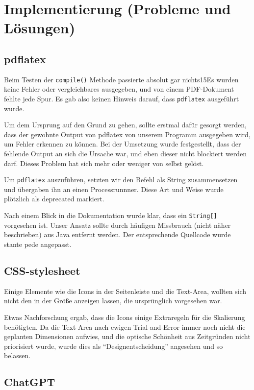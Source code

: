 \documentclass[stu, a4paper, 11pt, floatsintext]{apa7}
\begin{document}
\section{Implementierung (Probleme und Lösungen)}

\subsection{pdflatex}

\noindent Beim Testen der \texttt{compile()} Methode passierte absolut gar nichts15Es wurden keine Fehler oder vergleichbares ausgegeben, und von einem PDF-Dokument fehlte jede Spur.
Es gab also keinen Hinweis darauf, dass \texttt{pdflatex} ausgeführt wurde.

Um dem Ursprung auf den Grund zu gehen, sollte erstmal dafür gesorgt werden,
dass der gewohnte Output von pdflatex von unserem Programm ausgegeben wird, um Fehler erkennen zu können.
Bei der Umsetzung wurde festgestellt, dass der fehlende Output an sich die Ursache war, und eben dieser nicht blockiert werden darf.
Dieses Problem hat sich mehr oder weniger von selbst gelöst.

Um \texttt{pdflatex} auszuführen, setzten wir den Befehl als String zusammensetzen und übergaben ihn an einen Processrunnner.
Diese Art und Weise wurde plötzlich als deprecated markiert.

Nach einem Blick in die Dokumentation wurde klar, dass ein \texttt{String[]} vorgesehen ist.
Unser Ansatz sollte durch häufigen Missbrauch (nicht näher beschrieben) aus Java entfernt werden.
Der entsprechende Quellcode wurde stante pede angepasst.

\subsection{CSS-stylesheet}

\noindent Einige Elemente wie die Icons in der Seitenleiste und die Text-Area,
wollten sich nicht den in der Größe anzeigen lassen, die ursprünglich vorgesehen war.

Etwas Nachforschung ergab, dass die Icons einige Extraregeln für die Skalierung benötigten.
Da die Text-Area nach ewigen Trial-and-Error immer noch nicht die geplanten Dimensionen aufwies,
und die optische Schönheit aus Zeitgründen nicht priorisiert wurde, wurde dies als ``Designentscheidung'' angesehen und so belassen.

\subsection{ChatGPT}
\end{document}
